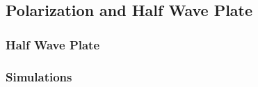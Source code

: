 



\subsection{Polarization and Half Wave Plate}
\subsubsection{Half Wave Plate}
\subsubsection{Simulations}





